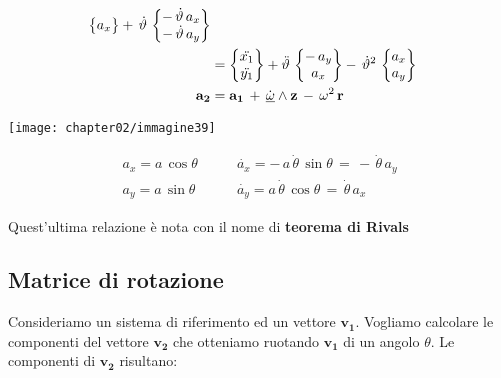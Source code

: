 \begin{minipage}{.45\textwidth}
\begin{align*}
\begin{Bmatrix}
											a_x
										\end{Bmatrix}
										+ \, \dot{\theta} \,
										\begin{Bmatrix}
											-\,\dot{\theta} \, a_x\\
											-\, \dot{\theta} \, a_y
										\end{Bmatrix}\vspace{2mm}\\
							&= 
									\begin{Bmatrix}
										\ddot{x_1}\\
										\ddot{y_1}
									\end{Bmatrix}
									+ \ddot{\theta} \,
									\begin{Bmatrix}
										- \, a_y\\
										a_x
									\end{Bmatrix}
									-\, \dot{\theta}^2\,
									\begin{Bmatrix}
										a_x\\
										a_y
									\end{Bmatrix}\vspace{2mm}\\
				\mathbf{a_2} &= \mathbf{a_1} \, + \, \dot{\underline{\omega}} \wedge \mathbf{z} \, -\, \omega^2 \, \mathbf{r}
		\end{align*}				
		\end{minipage}
		\hfill
		\begin{minipage}{.45\textwidth}
		\centering
			\texttt{[image: chapter02/immagine39]}

		\begin{eqnarray*}
			a_x = a \, \cos{\theta}\quad &\quad \dot{a_x} = -\, a \, \dot{\theta} \, \sin{\theta} \,= \, - \, \dot{\theta} \, a_y\\
			a_y = a \, \sin{\theta} \quad & \quad \dot{a_y} = a \, \dot{\theta} \, \cos{\theta} \, = \, \dot{\theta} \, a_x
		\end{eqnarray*}
		\end{minipage}
	
		\vspace{2mm}
		Quest'ultima relazione è nota con il nome di \textbf{teorema di Rivals}

		\subsection{Matrice di rotazione}
			Consideriamo un sistema di riferimento ed un vettore $\mathbf{v_1}$. Vogliamo calcolare le componenti del vettore $\mathbf{v_2}$ che otteniamo ruotando $\mathbf{v_1}$ di un angolo $\theta$. Le componenti di $\mathbf{v_2}$ risultano:
			

